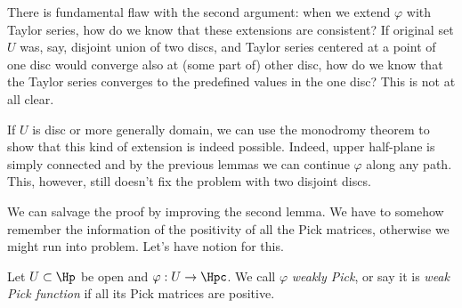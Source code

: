 There is fundamental flaw with the second argument: when we extend $\varphi$ with Taylor series, how do we know that these extensions are consistent? If original set $U$ was, say, disjoint union of two discs, and Taylor series centered at a point of one disc would converge also at (some part of) other disc, how do we know that the Taylor series converges to the predefined values in the one disc? This is not at all clear.

If $U$ is disc or more generally domain, we can use the monodromy theorem to show that this kind of extension is indeed possible. Indeed, upper half-plane is simply connected and by the previous lemmas we can continue $\varphi$ along any path. This, however, still doesn't fix the problem with two disjoint discs.

We can salvage the proof by improving the second lemma. We have to somehow remember the information of the positivity of all the Pick matrices, otherwise we might run into problem. Let's have notion for this.

\begin{maar}
	Let $U \subset \Hp$ be open and $\varphi : U \to \Hpc$. We call $\varphi$ \textit{weakly Pick}, or say it is \textit{weak Pick function} if all its Pick matrices are positive.
\end{maar}

